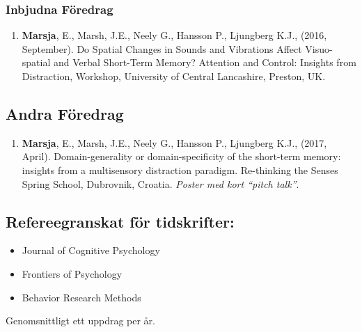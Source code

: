 \documentclass[]{article}
\providecommand{\tightlist}{%
  \setlength{\itemsep}{0pt}\setlength{\parskip}{0pt}}
\begin{document}
\hypertarget{inbjudna-fuxf6redrag}{%
\subsubsection{Inbjudna Föredrag}\label{inbjudna-fuxf6redrag}}

\begin{enumerate}
\def\labelenumi{\arabic{enumi}.}
\tightlist
\item
  \textbf{Marsja}, E., Marsh, J.E., Neely G., Hansson P., Ljungberg
  K.J., (2016, September). Do Spatial Changes in Sounds and Vibrations
  Affect Visuo-spatial and Verbal Short-Term Memory? Attention and
  Control: Insights from Distraction, Workshop, University of Central
  Lancashire, Preston, UK.
\end{enumerate}

\hypertarget{andra-fuxf6redrag}{%
\subsection{Andra Föredrag}\label{andra-fuxf6redrag}}

\begin{enumerate}
\def\labelenumi{\arabic{enumi}.}
\tightlist
\item
  \textbf{Marsja}, E., Marsh, J.E., Neely G., Hansson P., Ljungberg
  K.J., (2017, April). Domain-generality or domain-specificity of the
  short-term memory: insights from a multisensory distraction paradigm.
  Re-thinking the Senses Spring School, Dubrovnik, Croatia. \emph{Poster
  med kort ``pitch talk''}.
\end{enumerate}

\hypertarget{refereegranskat-fuxf6r-tidskrifter}{%
\subsection{Refereegranskat för
tidskrifter:}\label{refereegranskat-fuxf6r-tidskrifter}}

\begin{itemize}
\tightlist
\item
  Journal of Cognitive Psychology
\item
  Frontiers of Psychology
\item
  Behavior Research Methods
\end{itemize}

Genomsnittligt ett uppdrag per år.
\end{document}
